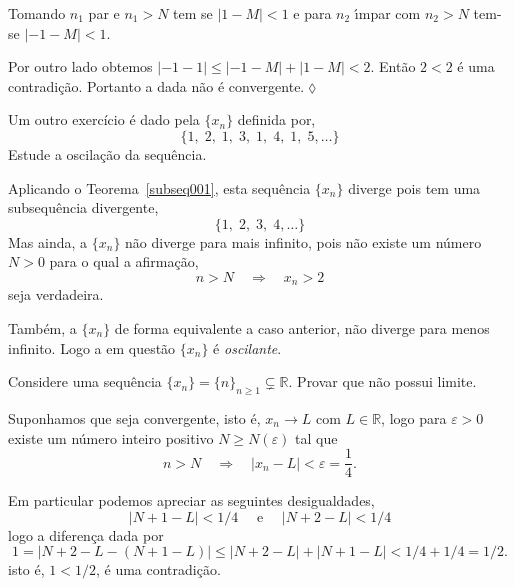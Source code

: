 Tomando $n_1$ par e $n_1>N$ tem se $|1-M|<1$ e para $n_2$ \'{\i}mpar com $n_2>N$ tem-se $|-1-M|<1$.

Por outro lado obtemos $|-1-1|\leq |-1-M|+|1-M|<2$. Ent\~{a}o $2<2$ \'{e}
uma contradi\c{c}\~{a}o. Portanto a \seq dada n\~{a}o \'{e} convergente.\hfill \(\lozenge\)

\begin{exer}
Um outro exercício  \'{e} dado pela \seq $\{ x_n\}$ definida por,
\begin{equation*}
    \{1,\; 2,\; 1,\; 3,\; 1,\; 4,\; 1,\; 5,\ldots  \}
\end{equation*}  
Estude a oscilação da sequência.
\end{exer}

\solo
Aplicando o Teorema~\ref{subseq001}, esta sequ\^{e}ncia $\{ x_n\}$ diverge pois tem uma subsequ\^{e}ncia divergente,
\begin{equation*}
    \{1,\; 2,\; 3,\; 4,\ldots \}
\end{equation*}
Mas ainda, a \seq $\{ x_n\}$ n\~{a}o diverge para mais infinito, pois n\~{a}o existe um n\'{u}mero $N>0$ para o qual a afirma\c{c}\~{a}o,
\begin{equation*}
    n>N\quad \Rightarrow \quad x_n>2
\end{equation*}
seja verdadeira.

Tamb\'{e}m, a \seq $\{ x_n\}$ de forma equivalente a caso anterior, n\~{a}o diverge para menos infinito. Logo a \seq em quest\~{a}o $\{ x_n\}$ \'{e} \emph{oscilante}.

\begin{exer}
Considere uma sequ\^{e}ncia $\{x_n\}=\{ n\}_{n\geq 1}\subsetneq \mathbb{R}$. Provar que n\~{a}o possui limite.
\end{exer}

\solo Suponhamos que seja convergente, isto \'{e}, $x_n\to L$ com $L\in \mathbb{R}$, logo para $\varepsilon>0$  existe um n\'{u}mero inteiro positivo $N\geq N(\varepsilon)$ tal que
\begin{equation*}
    n>N \quad \Rightarrow \quad |x_n-L|<\varepsilon=\frac{1}{4}.
\end{equation*}

Em particular podemos apreciar as seguintes desigualdades,
\begin{equation*}
    |N+1 - L|<1/4\quad \text{ e }\quad |N+2-L|<1/4
\end{equation*}
logo a diferen\c{c}a dada por
\begin{equation*}
   1=|N+2-L - (N+1-L)|\leq |N+2-L|+|N+1-L|<1/4+1/4=1/2.
\end{equation*}
isto \'{e}, $1<1/2$, \'{e} uma contradi\c{c}\~{a}o.

